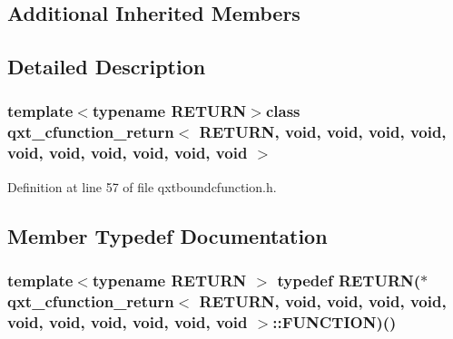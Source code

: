 \subsection*{Additional Inherited Members}


\subsection{Detailed Description}
\subsubsection*{template$<$typename R\-E\-T\-U\-R\-N$>$class qxt\-\_\-cfunction\-\_\-return$<$ R\-E\-T\-U\-R\-N, void, void, void, void, void, void, void, void, void, void $>$}



Definition at line 57 of file qxtboundcfunction.\-h.



\subsection{Member Typedef Documentation}
\hypertarget{classqxt__cfunction__return_3_01_r_e_t_u_r_n_00_01void_00_01void_00_01void_00_01void_00_01void_0ce0c927a0f7891905ce6ba11f318d802_a297376d0a9e412e14a1b832d6ea02e8a}{
\subsubsection[{F\-U\-N\-C\-T\-I\-O\-N}]{\setlength{\rightskip}{0pt plus 5cm}template$<$typename R\-E\-T\-U\-R\-N $>$ typedef R\-E\-T\-U\-R\-N($\ast$ {\bf qxt\-\_\-cfunction\-\_\-return}$<$ R\-E\-T\-U\-R\-N, {\bf void}, {\bf void}, {\bf void}, {\bf void}, {\bf void}, {\bf void}, {\bf void}, {\bf void}, {\bf void}, {\bf void} $>$\-::F\-U\-N\-C\-T\-I\-O\-N)()}}\label{classqxt__cfunction__return_3_01_r_e_t_u_r_n_00_01void_00_01void_00_01void_00_01void_00_01void_0ce0c927a0f7891905ce6ba11f318d802_a297376d0a9e412e14a1b832d6ea02e8a}


